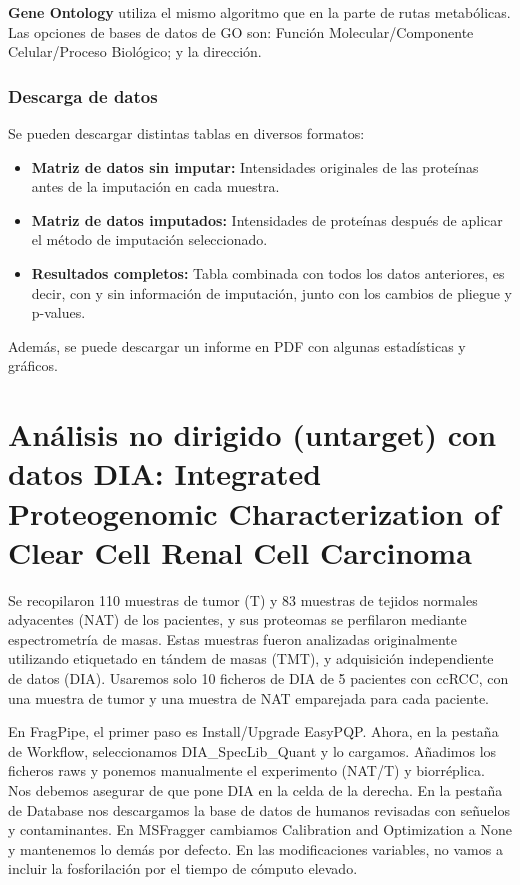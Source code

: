\documentclass[nochap]{config/ejercicios}
\begin{document}
\textbf{Gene Ontology} utiliza el mismo algoritmo que en la parte de rutas metabólicas. Las opciones de bases de datos de GO son: Función Molecular/Componente Celular/Proceso Biológico; y la dirección.

\subsubsection{Descarga de datos}
Se pueden descargar distintas tablas en diversos formatos:
\begin{itemize}
\item \textbf{Matriz de datos sin imputar:} Intensidades originales de las proteínas antes de la imputación en cada muestra.
\item \textbf{Matriz de datos imputados:} Intensidades de proteínas después de aplicar el método de imputación seleccionado.
\item \textbf{Resultados completos:} Tabla combinada con todos los datos anteriores, es decir, con y sin información de imputación, junto con los cambios de pliegue y p-values.
\end{itemize}

Además, se puede descargar un informe en PDF con algunas estadísticas y gráficos.

\section{Análisis no dirigido (untarget) con datos DIA: Integrated Proteogenomic Characterization of Clear Cell Renal Cell Carcinoma}
Se recopilaron 110 muestras de tumor (T) y 83 muestras de tejidos normales adyacentes (NAT) de los pacientes, y sus proteomas se perfilaron mediante espectrometría de masas. Estas muestras fueron analizadas originalmente utilizando etiquetado en tándem de masas (TMT), y adquisición independiente de datos (DIA). Usaremos solo 10 ficheros de DIA de 5 pacientes con ccRCC, con una muestra de tumor y una muestra de NAT emparejada para cada paciente.

En FragPipe, el primer paso es Install/Upgrade EasyPQP. Ahora, en la pestaña de Workflow, seleccionamos DIA\_SpecLib\_Quant y lo cargamos. Añadimos los ficheros raws y ponemos manualmente el experimento (NAT/T) y biorréplica. Nos debemos asegurar de que pone DIA en la celda de la derecha. En la pestaña de Database nos descargamos la base de datos de humanos revisadas con señuelos y contaminantes. En MSFragger cambiamos Calibration and Optimization a None y mantenemos lo demás por defecto. En las modificaciones variables, no vamos a incluir la fosforilación por el tiempo de cómputo elevado. 
\end{document}
